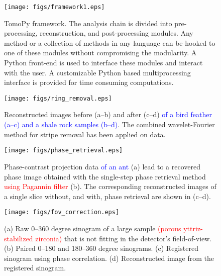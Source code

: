 \documentclass[pdf]{iucr}              %
\begin{document}




\begin{figure}
\centering
\texttt{[image: figs/framework1.eps]}
\caption{TomoPy framework. The analysis chain is divided into pre-processing, reconstruction, and post-processing modules. Any method or a collection of methods in any language can be hooked to one of these modules without compromising the modularity. A Python front-end is used to interface these modules and interact with the user. A customizable Python based multiprocessing interface is provided for time consuming computations.}
\label{fig:Framework}
\end{figure}

\begin{figure}
\centering
\texttt{[image: figs/ring\_removal.eps]}
\caption{Reconstructed images before (a--b) and after (c--d) \textcolor{blue}{of a bird feather (a--c) and a shale rock samples (b--d)}. The combined wavelet-Fourier method for stripe removal has been applied on data.}
\label{fig:ProcessRing}
\end{figure}

\begin{figure}
\centering
\texttt{[image: figs/phase\_retrieval.eps]}
\caption{Phase-contrast projection data \textcolor{blue}{of an ant} (a) lead to a recovered phase image obtained with the single-step phase retrieval method \textcolor{red}{using Pagannin filter} (b). The corresponding reconstructed images of a single slice without, and with, phase retrieval are shown in (c--d).}
\label{fig:ProcessPhase}
\end{figure}

\begin{figure}
\centering
\texttt{[image: figs/fov\_correction.eps]}
\caption{(a) Raw 0--360 degree sinogram of a large sample \textcolor{red}{(porous yttriz-stabilized zirconia)} that is not fitting in the detector's field-of-view. (b) Paired 0--180 and 180--360 degree sinograms. (c) Registered sinogram using phase correlation. (d) Reconstructed image from the registered sinogram.}
\label{fov_correction}
\end{figure}
\end{document}
